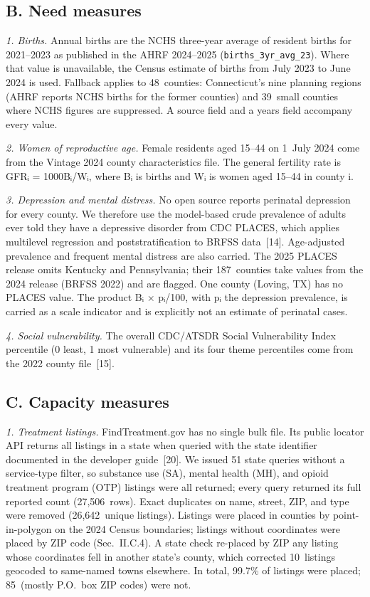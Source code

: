 \documentclass{article}
\begin{document}
\subsection*{B. Need measures}

\textit{1. Births.} 
Annual births are the NCHS three-year average of resident births for 2021--2023 as published in the AHRF 2024--2025 (\texttt{births\_3yr\_avg\_23}). Where that value is unavailable, the Census estimate of births from July 2023 to June 2024 is used. Fallback applies to 48\ counties: Connecticut's nine planning regions (AHRF reports NCHS births for the former counties) and 39\ small counties where NCHS figures are suppressed. A source field and a years field accompany every value.

\textit{2. Women of reproductive age.} 
Female residents aged 15--44 on 1~July 2024 come from the Vintage 2024 county characteristics file. The general fertility rate is GFRᵢ = 1000Bᵢ/Wᵢ, where Bᵢ is births and Wᵢ is women aged 15--44 in county i.

\textit{3. Depression and mental distress.} 
No open source reports perinatal depression for every county. We therefore use the model-based crude prevalence of adults ever told they have a depressive disorder from CDC PLACES, which applies multilevel regression and poststratification to BRFSS data~[14]. Age-adjusted prevalence and frequent mental distress are also carried. The 2025 PLACES release omits Kentucky and Pennsylvania; their 187\ counties take values from the 2024 release (BRFSS 2022) and are flagged. One county (Loving, TX) has no PLACES value. The product Bᵢ × pᵢ/100, with pᵢ the depression prevalence, is carried as a scale indicator and is explicitly not an estimate of perinatal cases.

\textit{4. Social vulnerability.} 
The overall CDC/ATSDR Social Vulnerability Index percentile (0 least, 1 most vulnerable) and its four theme percentiles come from the 2022 county file~[15].

\subsection*{C. Capacity measures}

\textit{1. Treatment listings.} 
FindTreatment.gov has no single bulk file. Its public locator API returns all listings in a state when queried with the state identifier documented in the developer guide~[20]. We issued 51 state queries without a service-type filter, so substance use (SA), mental health (MH), and opioid treatment program (OTP) listings were all returned; every query returned its full reported count (27,506\ rows). Exact duplicates on name, street, ZIP, and type were removed (26,642\ unique listings). Listings were placed in counties by point-in-polygon on the 2024 Census boundaries; listings without coordinates were placed by ZIP code (Sec.~II.C.4). A state check re-placed by ZIP any listing whose coordinates fell in another state's county, which corrected 10\ listings geocoded to same-named towns elsewhere. In total, 99.7\% of listings were placed; 85\ (mostly P.O.~box ZIP codes) were not.
\end{document}

